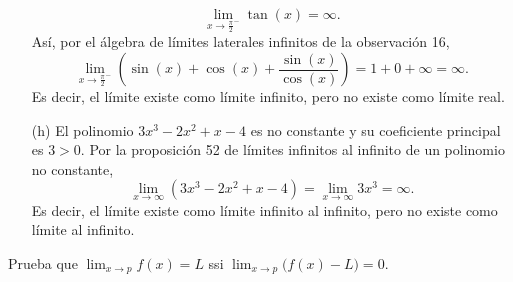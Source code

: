 \documentclass[12pt,a4paper]{article}
\begin{document}
\begin{solucion}
\begin{enumerate}
\begin{equation*}
                \lim_{x\to\frac{\pi}{2}^{-}}\tan(x)=\infty.
            \end{equation*}
            Así, por el álgebra de límites laterales infinitos de la observación 16,
            \begin{equation*}
                \lim_{x\to\frac{\pi}{2}^{-}}\left(\sin(x)+\cos(x)+\frac{\sin(x)}{\cos(x)}\right)=1+0+\infty=\infty.
            \end{equation*}
            Es decir, el límite existe como límite infinito, pero no existe como límite real.
            \item[(h)] El polinomio $3x^{3}-2x^{2}+x-4$ es no constante y su coeficiente principal es $3>0$. Por la proposición 52 de límites infinitos al infinito de un polinomio no constante,
            \begin{equation*}
                \lim_{x\to\infty}\left(3x^{3}-2x^{2}+x-4\right)=\lim_{x\to\infty}3x^{3}=\infty.
            \end{equation*}
            Es decir, el límite existe como límite infinito al infinito, pero no existe como límite al infinito.
        \end{enumerate}
    \end{solucion}

    \begin{problema}
        Prueba que $\displaystyle\lim_{x\to p}f(x)=L$ ssi $\displaystyle\lim_{x\to p}\bigl(f(x)-L\bigr)=0$.
    \end{problema}
\end{document}
